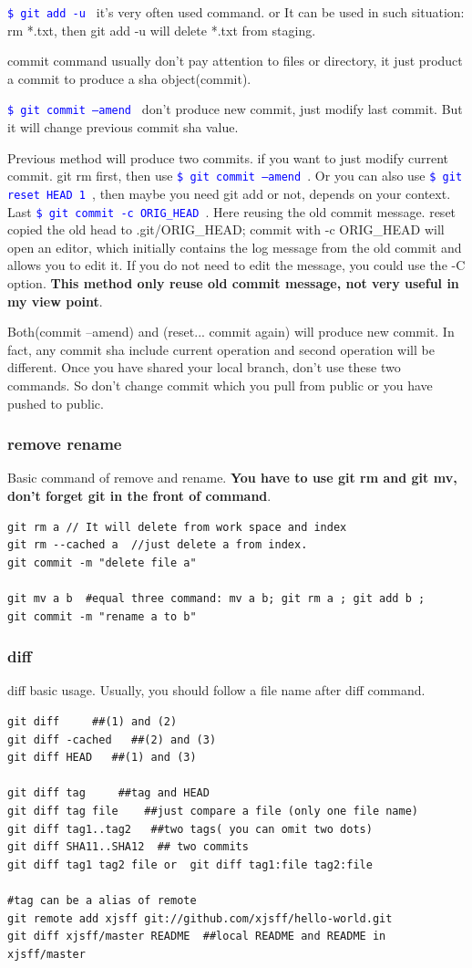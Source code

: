 \documentclass[paper=8.5in:11in, twoside, 12pt, pagesize=pdftex]{book}
\newcommand{\linuxcommand}[1]{\texttt{\textcolor{blue}{\$ #1 \Pisymbol{psy}{191}}}}
\begin{document}
	\linuxcommand{git add -u}   it's very often used command. or It can be used in such situation: rm *.txt, then git add -u will delete *.txt from staging.
	
	commit command usually don't pay attention to files or directory, it just product a commit to produce a sha object(commit). 
	
	\linuxcommand{git commit --amend}  don't produce new commit, just modify last commit. But it will change previous commit sha value. 
	
	
	Previous method will produce two commits. if you want to just modify current commit.  git rm first, then use \linuxcommand{git commit --amend}.  Or you can also use \linuxcommand{git reset HEAD~1}, then maybe you need git add or not, depends on your context. Last \linuxcommand{git commit -c ORIG\_HEAD}.  Here reusing the old commit message. reset copied the old head to .git/ORIG\_HEAD; commit with -c ORIG\_HEAD will open an editor, which initially contains the log message from the old commit and allows you to edit it. If you do not need to edit the message, you could use the -C option. \textbf{This method only reuse old commit message, not very useful in my view point}.
	
	Both(commit --amend) and (reset... commit again) will produce new commit. In fact, any commit sha include current operation and second operation will be different. Once you have shared your local branch, don't use these two commands. So don't change commit which you pull from public or you have pushed to public. 
	
\subsubsection{remove rename}
	Basic command of remove and rename.  \textbf{You have to use git rm and git mv, don't forget git in the front of command}.
\begin{lstlisting}
git rm a // It will delete from work space and index
git rm --cached a  //just delete a from index.
git commit -m "delete file a"

git mv a b  #equal three command: mv a b; git rm a ; git add b ;
git commit -m "rename a to b"		
\end{lstlisting}

\subsubsection{diff}
	diff basic usage. Usually, you should follow a file name after diff command. 
\begin{lstlisting}
git diff     ##(1) and (2)
git diff -cached   ##(2) and (3)
git diff HEAD   ##(1) and (3)

git diff tag     ##tag and HEAD
git diff tag file    ##just compare a file (only one file name)
git diff tag1..tag2   ##two tags( you can omit two dots)
git diff SHA11..SHA12  ## two commits
git diff tag1 tag2 file or  git diff tag1:file tag2:file

#tag can be a alias of remote
git remote add xjsff git://github.com/xjsff/hello-world.git
git diff xjsff/master README  ##local README and README in xjsff/master	
\end{lstlisting}	
	
\end{document}
